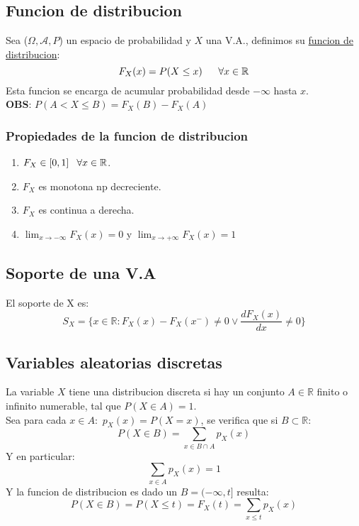 \documentclass[titlepage,a4paper]{article}
\begin{document}
\subsection{Funcion de distribucion}
Sea ($\Omega, \mathcal{A}, P$) un espacio de probabilidad y $X$ una V.A., definimos su \underline{funcion de distribucion}:
\begin{equation*}
    F_{X} (x) = P(X \leq x) \hspace{16px}  \forall x \in \mathbb{R}
\end{equation*}
Esta funcion se encarga de acumular probabilidad desde $-\infty$ hasta $x$.\\
\textbf{OBS}: $P(A < X \leq B) = F_{X}(B) - F_{X}(A)$
\subsubsection*{Propiedades de la funcion de distribucion}
\begin{enumerate}
    \item $F_{X} \in [0,1] \hspace{8px} \forall x \in \mathbb{R}$.
    \item $F_{X}$ es monotona np decreciente.
    \item $F_{X}$ es continua a derecha.
    \item $\lim_{x \to {-\infty}} F_{X}(x) = 0$ y $\lim_{x \to {+\infty}} F_{X}(x) = 1$
\end{enumerate}

\subsection{Soporte de una V.A}
El soporte de X es:
\begin{equation*}
    S_{X} = \{ x \in \mathbb{R} : F_{X}(x) - F_{X}(x^{-}) \neq 0 \vee \frac{dF_{X}(x)}{dx} \neq 0 \}
\end{equation*}

\subsection{Variables aleatorias discretas}
La variable $X$ tiene una distribucion discreta si hay un conjunto $A \in \mathbb{R}$ finito o infinito numerable, tal que $P(X \in A) = 1$.\\
Sea para cada $x \in A:$ $p_{X}(x) = P(X = x)$, se verifica que si $B \subset \mathbb{R}$: 
\begin{equation*}
    P(X \in B) = \sum_{x \in B \cap A} p_{X}(x)
\end{equation*}
Y en particular:
\begin{equation*}
    \sum_{x \in A} p_{X}(x) = 1 
\end{equation*}
Y la funcion de distribucion es dado un $B = (-\infty,t]$ resulta:
\begin{equation*}
    P(X \in B) = P(X \leq t) = F_{X}(t) = \sum_{x \leq t} p_{X}(x)
\end{equation*}
\end{document}
